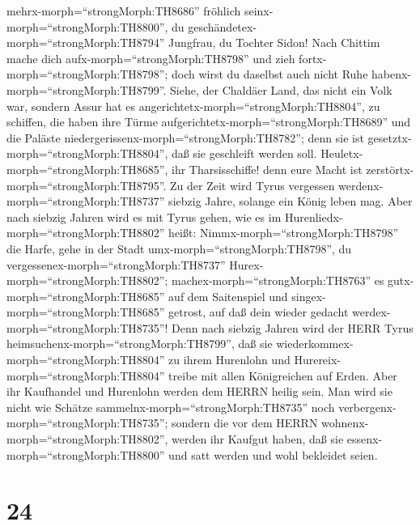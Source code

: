 mehrx-morph=``strongMorph:TH8686'' fröhlich
seinx-morph=``strongMorph:TH8800'', du
geschändetex-morph=``strongMorph:TH8794'' Jungfrau, du Tochter Sidon!
Nach Chittim mache dich aufx-morph=``strongMorph:TH8798'' und zieh
fortx-morph=``strongMorph:TH8798''; doch wirst du daselbst auch nicht
Ruhe habenx-morph=``strongMorph:TH8799''.  Siehe, der
Chaldäer Land, das nicht ein Volk war, sondern Assur hat es
angerichtetx-morph=``strongMorph:TH8804'', zu schiffen, die haben ihre
Türme aufgerichtetx-morph=``strongMorph:TH8689'' und die Paläste
niedergerissenx-morph=``strongMorph:TH8782''; denn sie ist
gesetztx-morph=``strongMorph:TH8804'', daß sie geschleift werden soll.
 Heuletx-morph=``strongMorph:TH8685'', ihr Tharsisschiffe!
denn eure Macht ist zerstörtx-morph=``strongMorph:TH8795''.
 Zu der Zeit wird Tyrus vergessen
werdenx-morph=``strongMorph:TH8737'' siebzig Jahre, solange ein König
leben mag. Aber nach siebzig Jahren wird es mit Tyrus gehen, wie es im
Hurenliedx-morph=``strongMorph:TH8802'' heißt: 
Nimmx-morph=``strongMorph:TH8798'' die Harfe, gehe in der Stadt
umx-morph=``strongMorph:TH8798'', du
vergessenex-morph=``strongMorph:TH8737''
Hurex-morph=``strongMorph:TH8802''; machex-morph=``strongMorph:TH8763''
es gutx-morph=``strongMorph:TH8685'' auf dem Saitenspiel und
singex-morph=``strongMorph:TH8685'' getrost, auf daß dein wieder gedacht
werdex-morph=``strongMorph:TH8735''!  Denn nach siebzig
Jahren wird der HERR Tyrus heimsuchenx-morph=``strongMorph:TH8799'', daß
sie wiederkommex-morph=``strongMorph:TH8804'' zu ihrem Hurenlohn und
Hurereix-morph=``strongMorph:TH8804'' treibe mit allen Königreichen auf
Erden.  Aber ihr Kaufhandel und Hurenlohn werden dem HERRN
heilig sein. Man wird sie nicht wie Schätze
sammelnx-morph=``strongMorph:TH8735'' noch
verbergenx-morph=``strongMorph:TH8735''; sondern die vor dem HERRN
wohnenx-morph=``strongMorph:TH8802'', werden ihr Kaufgut haben, daß sie
essenx-morph=``strongMorph:TH8800'' und satt werden und wohl bekleidet
seien.

\hypertarget{section-23}{%
\section{24}\label{section-23}}

